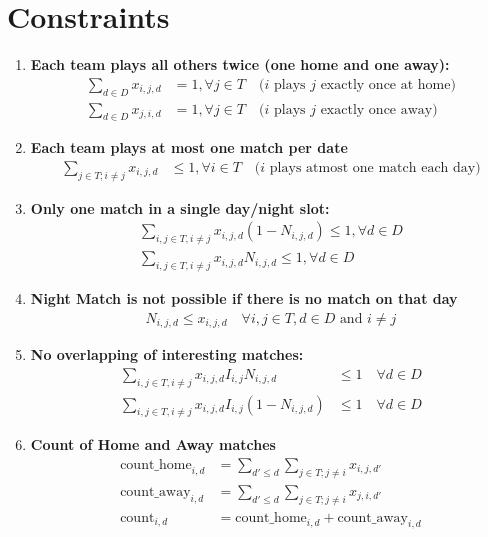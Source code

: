 \documentclass[a4paper, 12pt]{article}
\begin{document}
\section*{Constraints}
\begin{enumerate}
    \item \textbf{Each team plays all others twice (one home and one away):}
    \begin{align*}
        \sum_{d \in D} x_{i,j,d} &= 1 , \forall j \in T \quad \text{($i$ plays $j$ exactly once at home)}\\
        \sum_{d \in D} x_{j,i,d} &= 1 , \forall j \in T \quad \text{($i$ plays $j$ exactly once away)}
    \end{align*}

    \item \textbf{Each team plays at most one match per date}
    \begin{align*}
        \sum_{j \in T; i \neq j} x_{i,j,d} &\leq 1, \forall i \in T \quad \text{($i$ plays atmost one match each day)}
    \end{align*}

    \item \textbf{Only one match in a single day/night slot:}
    \begin{align*}
        \sum_{i,j \in T, i \neq j} x_{i,j,d} (1-N_{i,j,d}) \leq 1, \forall d \in D \\
        \sum_{i,j \in T, i \neq j} x_{i,j,d} N_{i,j,d} \leq 1, \forall d \in D 
    \end{align*}

    \item \textbf{Night Match is not possible if there is no match on that day}
    \begin{align*}
        N_{i,j,d} \leq x_{i,j,d} \quad \forall i,j \in T, d \in D \text{ and } i \neq j
    \end{align*}

    \item \textbf{No overlapping of interesting matches:}
    \begin{align*}
        \sum_{i,j \in T, i \neq j} x_{i,j,d} I_{i,j} N_{i,j,d} &\leq 1 \quad \forall d \in D \\
        \sum_{i,j \in T, i \neq j} x_{i,j,d} I_{i,j} (1 - N_{i,j,d}) &\leq 1 \quad \forall d \in D
    \end{align*}

    \item \textbf{Count of Home and Away matches}
    \begin{align*}
        \text{count\_home}_{i,d} &= \sum_{d' \leq d} \sum_{j \in T; j \neq i} x_{i,j,d'} \\
        \text{count\_away}_{i,d} &= \sum_{d' \leq d} \sum_{j \in T; j \neq i} x_{j,i,d'} \\
        \text{count}_{i,d} &= \text{count\_home}_{i,d} + \text{count\_away}_{i,d}
    \end{align*}


\end{enumerate}
\end{document}
